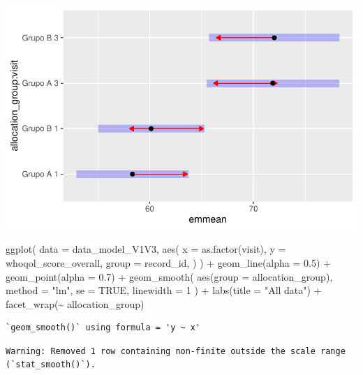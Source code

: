 \documentclass[
  letterpaper,
  DIV=11,
  numbers=noendperiod]{scrartcl}
\newenvironment{Shaded}{\begin{snugshade}}{\end{snugshade}}
\newcommand{\AttributeTok}[1]{\textcolor[rgb]{0.40,0.45,0.13}{#1}}
\newcommand{\ConstantTok}[1]{\textcolor[rgb]{0.56,0.35,0.01}{#1}}
\newcommand{\DecValTok}[1]{\textcolor[rgb]{0.68,0.00,0.00}{#1}}
\newcommand{\FloatTok}[1]{\textcolor[rgb]{0.68,0.00,0.00}{#1}}
\newcommand{\FunctionTok}[1]{\textcolor[rgb]{0.28,0.35,0.67}{#1}}
\newcommand{\NormalTok}[1]{\textcolor[rgb]{0.00,0.23,0.31}{#1}}
\newcommand{\SpecialCharTok}[1]{\textcolor[rgb]{0.37,0.37,0.37}{#1}}
\newcommand{\StringTok}[1]{\textcolor[rgb]{0.13,0.47,0.30}{#1}}
\begin{document}
\includegraphics{Outcomes_V1V2V3_files/figure-pdf/whoqol_score_overall_sens_emm-1.pdf}

\begin{Shaded}
\begin{Highlighting}[]
\FunctionTok{ggplot}\NormalTok{(}
    \AttributeTok{data =}\NormalTok{ data\_model\_V1V3, }
    \FunctionTok{aes}\NormalTok{(}
        \AttributeTok{x =} \FunctionTok{as.factor}\NormalTok{(visit),}
        \AttributeTok{y =}\NormalTok{ whoqol\_score\_overall,}
        \AttributeTok{group =}\NormalTok{ record\_id,}
\NormalTok{    )}
\NormalTok{) }\SpecialCharTok{+}
    \FunctionTok{geom\_line}\NormalTok{(}\AttributeTok{alpha =} \FloatTok{0.5}\NormalTok{) }\SpecialCharTok{+}
    \FunctionTok{geom\_point}\NormalTok{(}\AttributeTok{alpha =} \FloatTok{0.7}\NormalTok{) }\SpecialCharTok{+}
    \FunctionTok{geom\_smooth}\NormalTok{(}
        \FunctionTok{aes}\NormalTok{(}\AttributeTok{group =}\NormalTok{ allocation\_group),}
        \AttributeTok{method =} \StringTok{"lm"}\NormalTok{,}
        \AttributeTok{se =} \ConstantTok{TRUE}\NormalTok{,}
        \AttributeTok{linewidth =} \DecValTok{1}
\NormalTok{    ) }\SpecialCharTok{+}
    \FunctionTok{labs}\NormalTok{(}\AttributeTok{title =} \StringTok{"All data"}\NormalTok{) }\SpecialCharTok{+}
    \FunctionTok{facet\_wrap}\NormalTok{(}\SpecialCharTok{\textasciitilde{}}\NormalTok{ allocation\_group)}
\end{Highlighting}
\end{Shaded}

\begin{verbatim}
`geom_smooth()` using formula = 'y ~ x'
\end{verbatim}

\begin{verbatim}
Warning: Removed 1 row containing non-finite outside the scale range
(`stat_smooth()`).
\end{verbatim}
\end{document}

